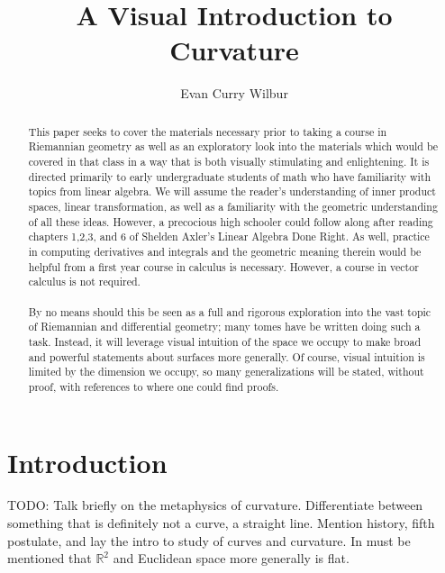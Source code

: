 \documentclass[]{article}
\title{A Visual Introduction to Curvature}
\author{Evan Curry Wilbur}
\newcommand\<{\ensuremath{\left\langle}}
\renewcommand\>{\ensuremath{\right\rangle}}
\newcommand{\RR}{\ensuremath{\mathbb{R}}}
\theoremstyle{definition}
\theoremstyle{definition}
\begin{document}
	\maketitle
	\begin{abstract}
		\indent
		This paper seeks to cover the materials necessary prior to taking a course in Riemannian geometry as well as an exploratory look into the materials which would be covered in that class in a way that is both visually stimulating and enlightening. It is directed primarily to early undergraduate students of math who have familiarity with topics from linear algebra. We will assume the reader's understanding of inner product spaces, linear transformation, as well as a familiarity with the geometric understanding of all these ideas. However, a precocious high schooler could follow along after reading chapters 1,2,3, and 6 of Shelden Axler's Linear Algebra Done Right. As well, practice in computing derivatives and integrals and the geometric meaning therein would be helpful from a first year course in calculus is necessary. However, a course in vector calculus is not required.
		\\
		\\
		\indent
		By no means should this be seen as a full and rigorous exploration into the vast topic of Riemannian and differential geometry; many tomes have be written doing such a task. Instead, it will leverage visual intuition of the space we occupy to make broad and powerful statements about surfaces more generally. Of course, visual intuition is limited by the dimension we occupy, so many generalizations will be stated, without proof, with references to where one could find proofs.
	\end{abstract}
	
	\section*{Introduction}
	TODO: Talk briefly on the metaphysics of curvature. Differentiate between something that is definitely not a curve, a straight line. Mention history, fifth postulate, and lay the intro to study of curves and curvature. In must be mentioned that $\RR^2$ and Euclidean space more generally is flat. 
	
	
\end{document}
